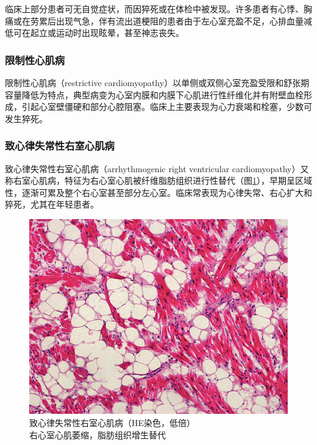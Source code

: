 临床上部分患者可无自觉症状，而因猝死或在体检中被发现。许多患者有心悸、胸痛或在劳累后出现气急，伴有流出道梗阻的患者由于左心室充盈不足，心排血量减低可在起立或运动时出现眩晕，甚至神志丧失。

\subsubsection{限制性心肌病}

限制性心肌病（restrictive
cardiomyopathy）以单侧或双侧心室充盈受限和舒张期容量降低为特点，典型病变为心室内膜和内膜下心肌进行性纤维化并有附壁血栓形成，引起心室壁僵硬和部分心腔阻塞。临床上主要表现为心力衰竭和栓塞，少数可发生猝死。

\subsubsection{致心律失常性右室心肌病}

致心律失常性右室心肌病（arrhythmogenic right ventricular
cardiomyopathy）又称右室心肌病，特征为右心室心肌被纤维脂肪组织进行性替代（图\ref{fig6-16}），早期呈区域性，逐渐可累及整个右心室甚至部分左心室。临床常表现为心律失常、右心扩大和猝死，尤其在年轻患者。

\begin{figure}[!htbp]
    \centering
    \includegraphics{./images/Image00109.jpg}
    \captionsetup{justification=centering}
    \caption{致心律失常性右室心肌病（HE染色，低倍）\\{\small 右心室心肌萎缩，脂肪组织增生替代}}
    \label{fig6-16}
\end{figure}



